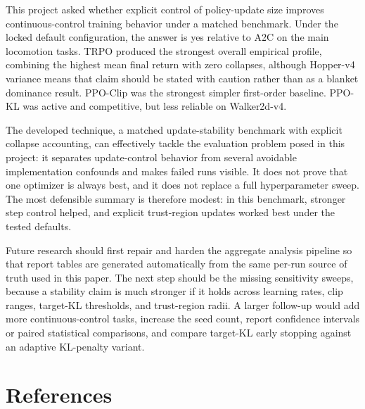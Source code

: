 \documentclass{article}
\begin{document}
This project asked whether explicit control of policy-update size improves continuous-control training behavior under a matched benchmark. Under the locked default configuration, the answer is yes relative to A2C on the main locomotion tasks. TRPO produced the strongest overall empirical profile, combining the highest mean final return with zero collapses, although Hopper-v4 variance means that claim should be stated with caution rather than as a blanket dominance result. PPO-Clip was the strongest simpler first-order baseline. PPO-KL was active and competitive, but less reliable on Walker2d-v4.

The developed technique, a matched update-stability benchmark with explicit collapse accounting, can effectively tackle the evaluation problem posed in this project: it separates update-control behavior from several avoidable implementation confounds and makes failed runs visible. It does not prove that one optimizer is always best, and it does not replace a full hyperparameter sweep. The most defensible summary is therefore modest: in this benchmark, stronger step control helped, and explicit trust-region updates worked best under the tested defaults.

Future research should first repair and harden the aggregate analysis pipeline so that report tables are generated automatically from the same per-run source of truth used in this paper. The next step should be the missing sensitivity sweeps, because a stability claim is much stronger if it holds across learning rates, clip ranges, target-KL thresholds, and trust-region radii. A larger follow-up would add more continuous-control tasks, increase the seed count, report confidence intervals or paired statistical comparisons, and compare target-KL early stopping against an adaptive KL-penalty variant.

\clearpage
\section*{References}
\end{document}
